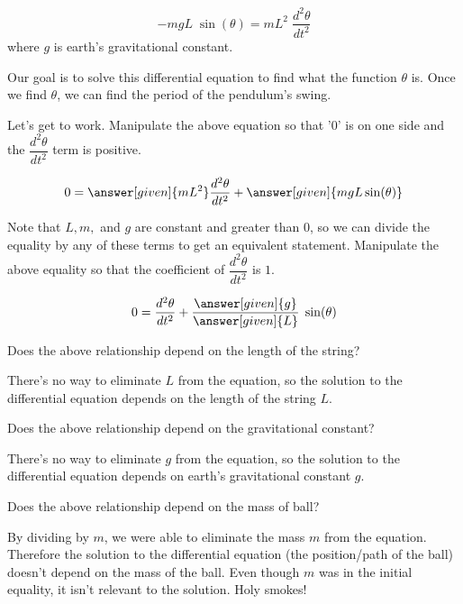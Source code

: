 \documentclass[handout,nooutcomes]{ximera}
\begin{document}
\begin{example}
\begin{explanation}
\[
-m g L \phantom{.} \sin(\theta) = m L^2 \phantom{.}\dfrac{d^2 \theta}{d t^2}
\]
where $g$ is earth's gravitational constant.

Our goal is to solve this differential equation to find what the function
$\theta$ is. Once we find $\theta$, we can find the period of the pendulum's swing.

Let's get to work. Manipulate the above equation so that '$0$'
is on one side and the $\dfrac{d^2 \theta}{d t^2}$ term is positive.

\[
0 = \answer[given]{m L^2} \dfrac{d^2 \theta}{d t^2}  + \answer[given]{m g L \sin(\theta)}
\]

Note that $L,m,$ and $g$ are constant and greater than $0$, so we can
divide the equality by any of these terms to get an equivalent statement.
Manipulate the above equality so that the coefficient of $\dfrac{d^2 \theta}{d t^2}$
is $1$.

\[
0 = \dfrac{d^2 \theta}{d t^2}  + \dfrac{\answer[given]{g}}{\answer[given]{L}} \phantom{.} \sin(\theta)
\]

\begin{question}
Does the above relationship depend on the length of the string?
\begin{multipleChoice}
\end{multipleChoice}
\begin{feedback}
There's no way to eliminate $L$ from the equation, so the solution
to the differential equation depends on the length of the string $L$.
\end{feedback}
\end{question}

\begin{question}
Does the above relationship depend on the gravitational constant?
\begin{multipleChoice}
\end{multipleChoice}
\begin{feedback}
There's no way to eliminate $g$ from the equation, so the solution
to the differential equation depends on earth's gravitational
constant $g$.
\end{feedback}
\end{question}

\begin{question}
Does the above relationship depend on the mass of ball?
\begin{multipleChoice}
\end{multipleChoice}
\begin{feedback}
By dividing by $m$, we were able to eliminate the mass $m$ from
the equation. Therefore the solution to the differential equation
(the position/path of the ball) doesn't depend
on the mass of the ball. Even though $m$ was in the initial equality,
it isn't relevant to the solution. Holy smokes!
\end{feedback}
\end{question}


\end{explanation}
\end{example}
\end{document}
